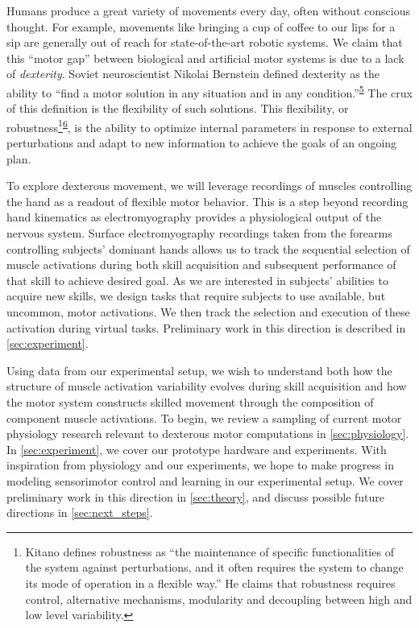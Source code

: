 \documentclass[
  a4paper,
]{article}
\begin{document}
Humans produce a great variety of movements every day, often without
conscious thought. For example, movements like bringing a cup of coffee
to our lips for a sip are generally out of reach for state-of-the-art
robotic systems. We claim that this ``motor gap'' between biological and
artificial motor systems is due to a lack of \emph{dexterity}. Soviet
neuroscientist Nikolai Bernstein defined dexterity as the ability to
``find a motor solution in any situation and in any
condition.''\textsuperscript{\protect\hyperlink{ref-Bernstein1967}{5}}
The crux of this definition is the flexibility of such solutions. This
flexibility, or
robustness\footnote{Kitano defines robustness as ``the maintenance of
  specific functionalities of the system against perturbations, and it
  often requires the system to change its mode of operation in a
  flexible way.'' He claims that robustness requires control,
  alternative mechanisms, modularity and decoupling between high and low
  level variability.}\textsuperscript{\protect\hyperlink{ref-kitanoBiologicalRobustness2004}{6}},
is the ability to optimize internal parameters in response to external
perturbations and adapt to new information to achieve the goals of an
ongoing plan.

To explore dexterous movement, we will leverage recordings of muscles
controlling the hand as a readout of flexible motor behavior. This is a
step beyond recording hand kinematics as electromyography provides a
physiological output of the nervous system. Surface electromyography
recordings taken from the forearms controlling subjects' dominant hands
allows us to track the sequential selection of muscle activations during
both skill acquisition and subsequent performance of that skill to
achieve desired goal. As we are interested in subjects' abilities to
acquire new skills, we design tasks that require subjects to use
available, but uncommon, motor activations. We then track the selection
and execution of these activation during virtual tasks. Preliminary work
in this direction is described in \cref{sec:experiment}.

Using data from our experimental setup, we wish to understand both how
the structure of muscle activation variability evolves during skill
acquisition and how the motor system constructs skilled movement through
the composition of component muscle activations. To begin, we review a
sampling of current motor physiology research relevant to dexterous
motor computations in \cref{sec:physiology}. In \cref{sec:experiment},
we cover our prototype hardware and experiments. With inspiration from
physiology and our experiments, we hope to make progress in modeling
sensorimotor control and learning in our experimental setup. We cover
preliminary work in this direction in \cref{sec:theory}, and discuss
possible future directions in \cref{sec:next_steps}.
\end{document}
